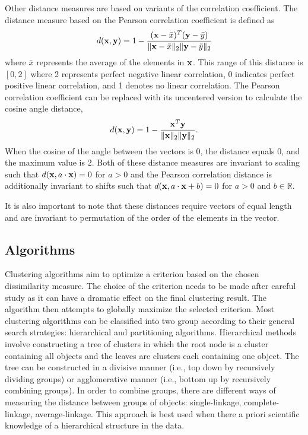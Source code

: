 Other distance measures are based on variants of the correlation coefficient. The distance measure based on the Pearson correlation coefficient is defined as
$$d(\mathbf x,\mathbf y) =1 - \frac{(\mathbf x - \bar{x})^{T}(\mathbf y - \bar{y})}{\|\mathbf x - \bar{x}\|_{2}\|\mathbf y - \bar{y}\|_{2}}$$
where $\bar{x}$ represents the average of the elements in $\mathbf x$. This range of this distance is $[0,2]$ where 2 represents perfect negative linear correlation, 0 indicates perfect positive linear correlation, and 1 denotes no linear correlation. The Pearson correlation coefficient can be replaced with its uncentered version to calculate the cosine angle distance,
$$d(\mathbf x,\mathbf y) =1 - \frac{\mathbf x ^{T}\mathbf y }{\|\mathbf x\|_{2}\|\mathbf y \|_{2}}.$$
When the cosine of the angle between the vectors is 0, the distance equals 0, and the maximum value is 2. Both of these distance measures are invariant to scaling such that $d(\mathbf x, a\cdot \mathbf x) = 0$ for $a>0$ and the Pearson correlation distance is additionally invariant to shifts such that $d(\mathbf x, a\cdot \mathbf x +b) = 0$ for $a>0$ and $b\in \mathbb{R}$. 

It is also important to note that these distances require vectors of equal length and are invariant to permutation of the order of the elements in the vector.

\subsection{Algorithms}
Clustering algorithms aim to optimize a criterion based on the chosen dissimilarity measure. The choice of the criterion needs to be made after careful study as it can have a dramatic effect on the final clustering result. The algorithm then attempts to globally maximize the selected criterion. Most clustering algorithms can be classified into two group according to their general search strategies: hierarchical and partitioning algorithms. Hierarchical methods involve constructing a tree of clusters in which the root node is a cluster containing all objects and the leaves are clusters each containing one object. The tree can be constructed in a divisive manner (i.e., top down by recursively dividing groups) or agglomerative manner (i.e., bottom up by recursively combining groups). In order to combine groups, there are different ways of measuring the distance between groups of objects: single-linkage, complete-linkage, average-linkage. This approach is best used when there a priori scientific knowledge of a hierarchical structure in the data.

